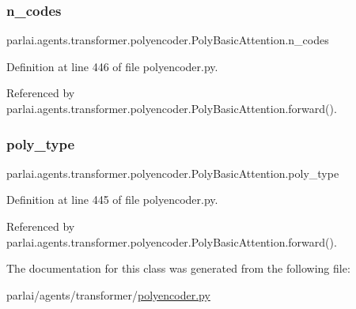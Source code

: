 \subsubsection{\texorpdfstring{n\+\_\+codes}{n\_codes}}
{\footnotesize\ttfamily parlai.\+agents.\+transformer.\+polyencoder.\+Poly\+Basic\+Attention.\+n\+\_\+codes}



Definition at line 446 of file polyencoder.\+py.



Referenced by parlai.\+agents.\+transformer.\+polyencoder.\+Poly\+Basic\+Attention.\+forward().

\mbox{\label{classparlai_1_1agents_1_1transformer_1_1polyencoder_1_1PolyBasicAttention_aa82d4585cb9a4f671353565fcc0785ab}} 
\subsubsection{\texorpdfstring{poly\+\_\+type}{poly\_type}}
{\footnotesize\ttfamily parlai.\+agents.\+transformer.\+polyencoder.\+Poly\+Basic\+Attention.\+poly\+\_\+type}



Definition at line 445 of file polyencoder.\+py.



Referenced by parlai.\+agents.\+transformer.\+polyencoder.\+Poly\+Basic\+Attention.\+forward().



The documentation for this class was generated from the following file\+:\begin{DoxyCompactItemize}
\item 
parlai/agents/transformer/\hyperlink{polyencoder_8py}{polyencoder.\+py}\end{DoxyCompactItemize}
